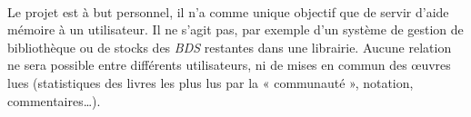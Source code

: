 \paragraph{}
Le projet est à but personnel, il n'a comme unique objectif que de servir d'aide mémoire à un utilisateur.
Il ne s'agit pas, par exemple d'un système de gestion de bibliothèque ou de stocks des \emph{BDS} restantes dans une librairie.
Aucune relation ne sera possible entre différents utilisateurs, ni de mises en commun des œuvres lues
(statistiques des livres les plus lus par la « communauté », notation, commentaires…).
